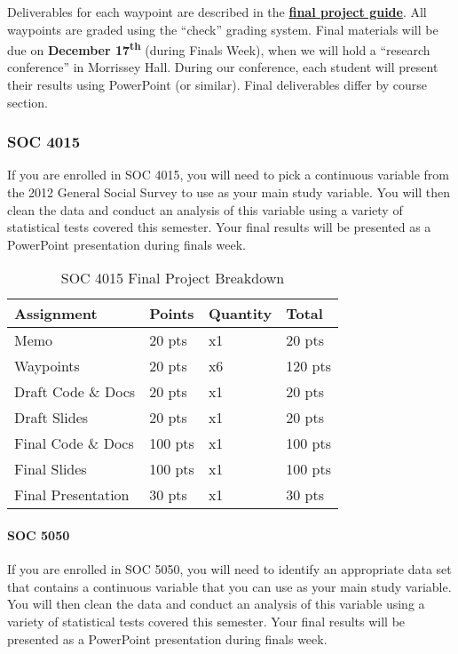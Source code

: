 \documentclass[]{book}
\let\oldparagraph\paragraph
\renewcommand{\paragraph}[1]{\oldparagraph{#1}\mbox{}}
\theoremstyle{definition}
\theoremstyle{definition}
\theoremstyle{definition}
\theoremstyle{remark}
\begin{document}
Deliverables for each waypoint are described in the
\href{https://slu-soc5050.github.io/finalGuide}{\textbf{final project
guide}}. All waypoints are graded using the ``check'' grading system.
Final materials will be due on \textbf{December 17\textsuperscript{th}}
(during Finals Week), when we will hold a ``research conference'' in
Morrissey Hall. During our conference, each student will present their
results using PowerPoint (or similar). Final deliverables differ by
course section.

\subsubsection{SOC 4015}\label{soc-4015}

If you are enrolled in SOC 4015, you will need to pick a continuous
variable from the 2012 General Social Survey to use as your main study
variable. You will then clean the data and conduct an analysis of this
variable using a variety of statistical tests covered this semester.
Your final results will be presented as a PowerPoint presentation during
finals week.

\begin{table}

\caption{\label{tab:unnamed-chunk-6}SOC 4015 Final Project Breakdown}
\centering
\begin{tabular}[t]{llll}
\toprule
Assignment & Points & Quantity & Total\\
\midrule
Memo & 20 pts & x1 & 20 pts\\
Waypoints & 20 pts & x6 & 120 pts\\
Draft Code \& Docs & 20 pts & x1 & 20 pts\\
Draft Slides & 20 pts & x1 & 20 pts\\
Final Code \& Docs & 100 pts & x1 & 100 pts\\
\addlinespace
Final Slides & 100 pts & x1 & 100 pts\\
Final Presentation & 30 pts & x1 & 30 pts\\
\bottomrule
\end{tabular}
\end{table}

\paragraph{SOC 5050}\label{soc-5050}

If you are enrolled in SOC 5050, you will need to identify an
appropriate data set that contains a continuous variable that you can
use as your main study variable. You will then clean the data and
conduct an analysis of this variable using a variety of statistical
tests covered this semester. Your final results will be presented as a
PowerPoint presentation during finals week.
\end{document}
